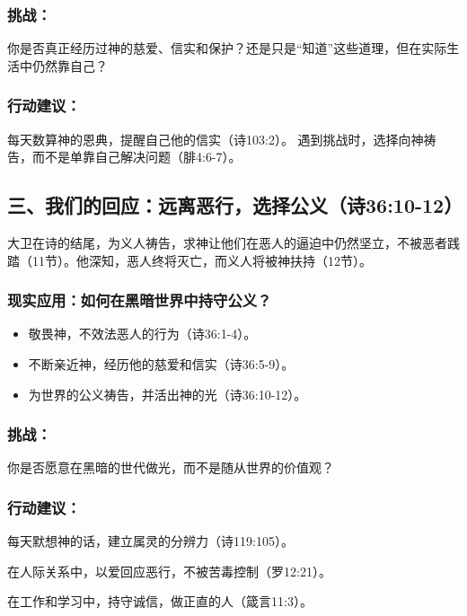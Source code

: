 \documentclass[a4paper, 12pt]{article}
\begin{document}
\subsubsection*{挑战：}
你是否真正经历过神的慈爱、信实和保护？还是只是“知道”这些道理，但在实际生活中仍然靠自己？

\subsubsection*{行动建议：}

每天数算神的恩典，提醒自己他的信实（诗103:2）。
遇到挑战时，选择向神祷告，而不是单靠自己解决问题（腓4:6-7）。
\subsection*{三、我们的回应：远离恶行，选择公义（诗36:10-12）}

大卫在诗的结尾，为义人祷告，求神让他们在恶人的逼迫中仍然坚立，不被恶者践踏（11节）。他深知，恶人终将灭亡，而义人将被神扶持（12节）。

\subsubsection*{现实应用：如何在黑暗世界中持守公义？}
\begin{itemize}
    \item 敬畏神，不效法恶人的行为（诗36:1-4）。

    \item 不断亲近神，经历他的慈爱和信实（诗36:5-9）。

    \item 为世界的公义祷告，并活出神的光（诗36:10-12）。

\end{itemize}
\subsubsection*{挑战：}
你是否愿意在黑暗的世代做光，而不是随从世界的价值观？

\subsubsection*{行动建议：}

\hspace{0.6cm}每天默想神的话，建立属灵的分辨力（诗119:105）。

在人际关系中，以爱回应恶行，不被苦毒控制（罗12:21）。

在工作和学习中，持守诚信，做正直的人（箴言11:3）。
\end{document}
